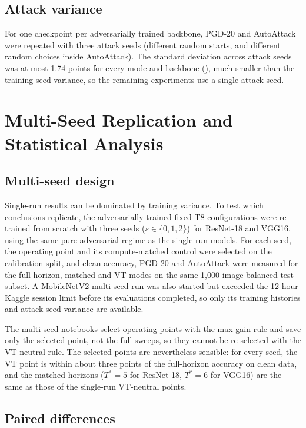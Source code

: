 \subsection{Attack variance}

For one checkpoint per adversarially trained backbone, PGD-20 and AutoAttack were repeated with three attack seeds (different random starts, and different random choices inside AutoAttack). The standard deviation across attack seeds was at most 1.74 points for every mode and backbone (), much smaller than the training-seed variance, so the remaining experiments use a single attack seed.

\section{Multi-Seed Replication and Statistical Analysis}
\label{sec:meth-stats}

\subsection{Multi-seed design}

Single-run results can be dominated by training variance. To test which conclusions replicate, the adversarially trained fixed-T8 configurations were re-trained from scratch with three seeds ($s \in \{0, 1, 2\}$) for ResNet-18 and VGG16, using the same pure-adversarial regime as the single-run models. For each seed, the operating point and its compute-matched control were selected on the calibration split, and clean accuracy, PGD-20 and AutoAttack were measured for the full-horizon, matched and VT modes on the same 1{,}000-image balanced test subset. A MobileNetV2 multi-seed run was also started but exceeded the 12-hour Kaggle session limit before its evaluations completed, so only its training histories and attack-seed variance are available.

The multi-seed notebooks select operating points with the max-gain rule and save only the selected point, not the full sweeps, so they cannot be re-selected with the VT-neutral rule. The selected points are nevertheless sensible: for every seed, the VT point is within about three points of the full-horizon accuracy on clean data, and the matched horizons ($T^* = 5$ for ResNet-18, $T^* = 6$ for VGG16) are the same as those of the single-run VT-neutral points.

\subsection{Paired differences}

